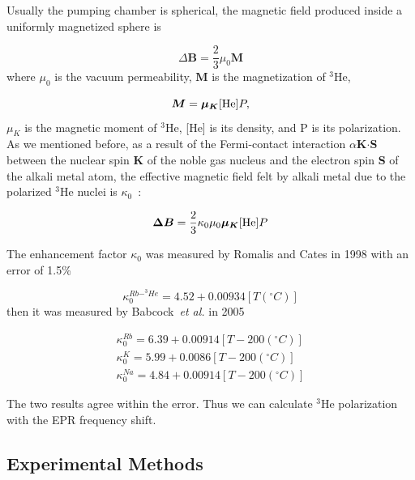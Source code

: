 Usually the pumping chamber is spherical, the magnetic field produced inside a uniformly magnetized sphere is~\cite{Jackson}

\begin{equation}
\Delta \boldsymbol{B}=\frac{2}{3}\mu_{0}\boldsymbol{M}
\end{equation}
where $\mu_{0}$ is the vacuum permeability, $\boldsymbol{M}$ is the magnetization of $^{3}$He, 

\begin{equation}
\boldsymbol{M}=\boldsymbol{\mu_{K}}[{\rm He}]P,
\end{equation}
$\mu_{K}$ is the magnetic moment of $^{3}$He, [He] is its density, and P is its polarization. As we mentioned before, as a result of the Fermi-contact interaction $\alpha${\bf K$\cdot$S} between the nuclear spin {\bf K} of the noble gas nucleus and the electron spin {\bf S} of the alkali metal atom, the effective magnetic field felt by alkali metal due to the polarized $^3$He nuclei is $\kappa_{0}$~\cite{PhysRevA.58.3004}:

\begin{equation}
\boldsymbol{\Delta B}=\frac{2}{3} \kappa_{0}\mu_{0}\boldsymbol{\mu_{K}}[{\rm He}]P
\end{equation}

The enhancement factor $\kappa_{0}$ was measured by Romalis and Cates in 1998 with an error of 1.5\%~\cite{PhysRevA.58.3004}

\begin{equation}
\kappa_{0}^{Rb-^{3}He}=4.52+0.00934[T(^{\circ}C)]
\end{equation}
then it was measured by Babcock~\emph{et al.} in 2005~\cite{PhysRevA.71.013414}

\begin{subequations}
	\begin{gather}
	\kappa_{0}^{Rb}=6.39+0.00914[T-200(^{\circ}C)]\\
	\kappa_{0}^{K}=5.99+0.0086[T-200(^{\circ}C)]\\
	\kappa_{0}^{Na}=4.84+0.00914[T-200(^{\circ}C)]
	\end{gather}
\end{subequations}

The two results agree within the error. Thus we can calculate $^{3}$He polarization with the EPR frequency shift. 

\subsection{Experimental Methods}

